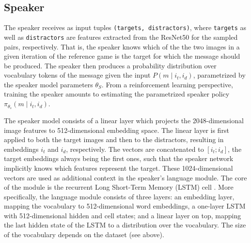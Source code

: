 \subsection{Speaker}
The speaker receives as input tuples \texttt{(targets, distractors)}, where \texttt{targets} as well as \texttt{distractors} are features extracted from the ResNet50 for the sampled pairs, respectively. That is, the speaker knows which of the the two images in a given iteration of the reference game is the target for which the message should be produced. The speaker then produces a probability distribution over vocabulary tokens of the message given the input $P(m \mid i_t, i_d)$, parametrized by the speaker model parameters $\theta_S$. From a reinforcement learning perspective, training the speaker amounts to estimating the parametrized speaker policy $\pi_{\theta_s}(m \mid i_t, i_d)$.

The speaker model consists of a linear layer which projects the 2048-dimensional image features to 512-dimensional embedding space. The linear layer is first applied to both the target images and then to the distractors, resulting in embeddings $i_t$ and $i_d$, respectively. The vectors are concatenated to $[i_t; i_d]$, the target embeddings always being the first ones, such that the speaker network implicitly knows which features represent the target. These 1024-dimensional vectors are used as additional context in the speaker's language module. The core of the module is the recurrent Long Short-Term Memory (LSTM) cell \parencite{hochreiter1997long}. More specifically, the language module consists of three layers: an embedding layer, mapping the vocabulary to 512-dimensional word embeddings, a one-layer LSTM with 512-dimensional hidden and cell states; and a linear layer on top, mapping the last hidden state of the LSTM to a distribution over the vocabulary. The size of the vocabulary depends on the dataset (see above).

